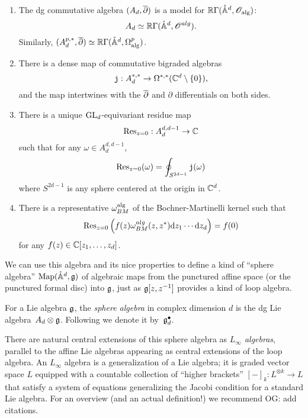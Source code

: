 \documentclass[11pt]{amsart}
\def\pAA{\mathring{\AA}}
\def\jou{{\mathtt{j}}}
\def\owen#1{{\textcolor{violet!65!black}{OG: {#1}}}}
\begin{document}
\begin{prop}
\label{prop: Ad} $\;$
\begin{enumerate}
\item
The dg commutative algebra $(A_d,{\overline{\partial}})$ is a model for $\RR \Gamma(\pAA^d, \sO_{\rm alg})$:
\[
A_d \simeq \RR\Gamma(\pAA^{d}, \sO^{alg}) .
\]
Similarly, $(A_d^{p,*},\dbar) \simeq \RR \Gamma(\pAA^{d}, \Omega^{p}_{\rm alg})$.
\item There is a dense map of commutative bigraded algebras
\[
\jou : A^{*,*}_d \to \Omega^{*,*}(\CC^d \setminus \{0\}),
\]
and the map intertwines with the ${\overline{\partial}}$ and $\partial$ differentials on both sides.
\item There is a unique ${\rm GL}_d$-equivariant residue map
\[
{\rm Res}_{z=0} : A_d^{d,d-1} \to \mathbb C
\]
such that for any $\omega \in A^{d,d-1}_d$,
\[
{\rm Res}_{z=0} (\omega) = \oint_{S^{2d-1}} \jou(\omega)
\]
where $S^{2d-1}$ is any sphere centered at the origin in $\mathbb C^d$. 
\item There is a representative $\omega_{BM}^{\rm alg}$ of the Bochner-Martinelli kernel such that
\[
{\rm Res}_{z=0} \left(f(z) \omega_{BM}^{alg}(z,z^*) {\rm d} z_1 \cdots {\rm d} z_d\right) = f(0)
\]
for any $f (z) \in \mathbb C[z_1,\ldots,z_d]$. 
\end{enumerate}
\end{prop}

We can use this algebra and its nice properties to define a kind of ``sphere algebra'' $\Map(\pAA^d,\fg)$ of algebraic maps from the punctured affine space (or the punctured formal disc) into $\mathfrak g$,
just as $\mathfrak g[z,z^{-1}]$ provides a kind of loop algebra.

\begin{dfn}
For a Lie algebra $\mathfrak g$, the {\em sphere algebra} in complex dimension $d$ is the dg Lie algebra~$A_d \otimes \mathfrak g$.
Following \cite{FHK} we denote it by~$\mathfrak g^\bullet_d$.
\end{dfn}

There are natural central extensions of this sphere algebra as {\em $L_\infty$ algebras},
parallel to the affine Lie algebras appearing as central extensions of the loop algebra.
An $L_\infty$ algebra is a generalization of a Lie algebra;
it is graded vector space $L$ equipped with a countable collection of ``higher brackets'' $[-]_k: L^{\otimes k} \to L$ that satisfy a system of equations generalizing the Jacobi condition for a standard Lie algebra.
For an overview (and an actual definition!) we recommend \owen{add citations}.
\end{document}
